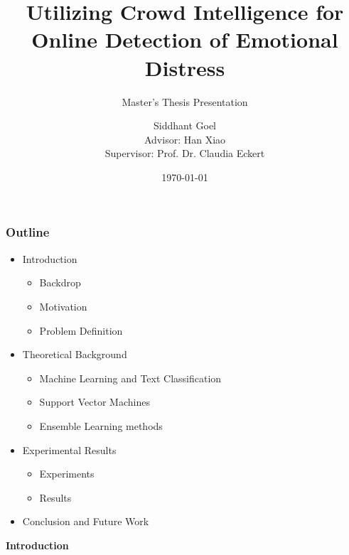 \documentclass{beamer}
\title{Utilizing Crowd Intelligence for Online Detection of Emotional Distress}
\subtitle{Master's Thesis Presentation}
\author[Siddhant Goel]{Siddhant Goel\\{\small Advisor: Han Xiao\\Supervisor: Prof. Dr. Claudia Eckert}}
\institute{
Chair for IT Security\\
Technische Universit\"at M\"unchen
}
\date{\today}
\begin{document}
    \begin{frame}[plain]
        \titlepage
    \end{frame}
    
    \begin{frame}
        \frametitle{Outline}
        \begin{itemize}
            \item{
            Introduction
            \begin{itemize}
                \item{Backdrop}
                \item{Motivation}
                \item{Problem Definition}
            \end{itemize}
            }
            \item{
            Theoretical Background
            \begin{itemize}
                \item{Machine Learning and Text Classification}
                \item{Support Vector Machines}
                \item{Ensemble Learning methods}
            \end{itemize}
            }
            \item{
            Experimental Results
            \begin{itemize}
                \item{Experiments}
                \item{Results}
            \end{itemize}
            }
            \item{Conclusion and Future Work}
        \end{itemize}
    \end{frame}
    
    \begin{frame}
        \begin{center}
            \textbf{Introduction}
        \end{center}
    \end{frame}
    
\end{document}
